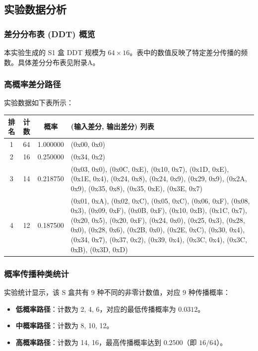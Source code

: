 \documentclass[12pt,a4paper]{article}
\begin{document}
\subsection{实验数据分析}

\subsubsection{差分分布表 (DDT) 概览}
本实验生成的 S1 盒 DDT 规模为 $64 \times 16$。表中的数值反映了特定差分传播的频数。具体差分分布表见附录A。
\subsubsection{高概率差分路径}
实验数据如下表所示：

\begin{table}[H]
\centering
\caption{S1 盒高概率差分路径汇总表}
\begin{small}
\begin{longtable}{|c|c|c|p{8cm}|}
\hline
\textbf{排名} & \textbf{计数} & \textbf{概率} & \textbf{(输入差分, 输出差分) 列表} \\ \hline
1 & 64 & 1.000000 & (0x00, 0x0) \\ \hline
2 & 16 & 0.250000 & (0x34, 0x2) \\ \hline
3 & 14 & 0.218750 & (0x03, 0x0), (0x0C, 0xE), (0x10, 0x7), (0x1D, 0xE), (0x1E, 0x4), (0x24, 0x8), (0x24, 0x9), (0x29, 0x9), (0x2A, 0x9), (0x35, 0x8), (0x35, 0xE), (0x3E, 0x7) \\ \hline
4 & 12 & 0.187500 & (0x01, 0xA), (0x02, 0xC), (0x05, 0xC), (0x06, 0xF), (0x08, 0x3), (0x09, 0xF), (0x0B, 0xF), (0x10, 0xB), (0x1C, 0x7), (0x20, 0x5), (0x20, 0xF), (0x24, 0x0), (0x25, 0x3), (0x28, 0x0), (0x28, 0x6), (0x2B, 0x0), (0x2E, 0xC), (0x30, 0x4), (0x34, 0x7), (0x37, 0x2), (0x39, 0x4), (0x3C, 0x4), (0x3C, 0xB), (0x3D, 0xD) \\ \hline
\end{longtable}
\end{small}
\end{table}

\subsubsection{概率传播种类统计}
实验统计显示，该 S 盒共有 9 种不同的非零计数值，对应 9 种传播概率：
\begin{itemize}
    \item \textbf{低概率路径}：计数为 2, 4, 6，对应的最低传播概率为 $0.0312$。
    \item \textbf{中概率路径}：计数为 8, 10, 12。
    \item \textbf{高概率路径}：计数为 14, 16，最高传播概率达到 $0.2500$（即 $16/64$）。
\end{itemize}
\end{document}
